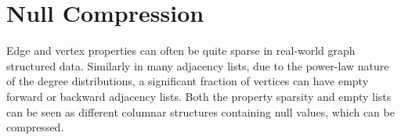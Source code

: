 

\section{Null Compression}
\label{sec:null}

Edge and vertex properties can often be quite sparse in real-world graph structured data. Similarly in many adjacency lists, due to the power-law nature of the degree distributions, a significant fraction of vertices can have empty forward or backward adjacency lists. Both the property sparsity and empty lists can be seen as different columnar structures containing null values, which can be compressed.


